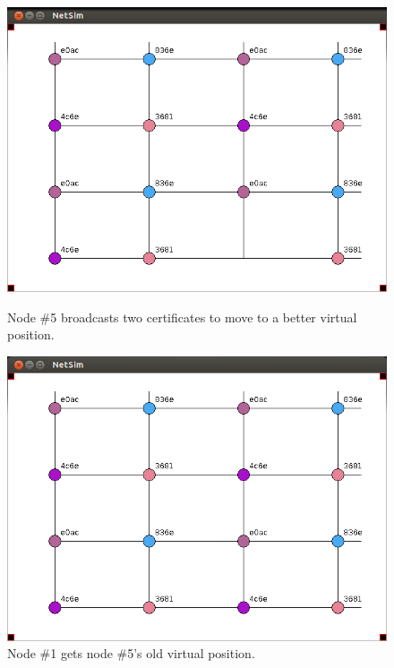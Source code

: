 \documentclass[ %
                    author={Luke Murray},
                supervisor={Dr. Simon Hollis},
                     title={Shadow Peer-to-Peer Networks},
                  subtitle={},
                    degree={MEng},
                      year={2013} ]{thesis}
\begin{document}
\begin{figure}[h]
    \centering
    \begin{minipage}[b]{0.45\linewidth}
        \centering
        \includegraphics[width=\linewidth]{sim_pics/balance_8.png}
        \caption{Node \#5 broadcasts two certificates to move to a better virtual position.}
        \label{sim_balance5}
    \end{minipage}
    \hspace{0.5cm}
    \begin{minipage}[b]{0.45\linewidth}
        \centering
        \includegraphics[width=\linewidth]{sim_pics/balance_9.png}
        \caption{Node \#1 gets node \#5's old virtual position.}
        \label{sim_balance6}

\end{minipage}
\end{figure}
\end{document}
